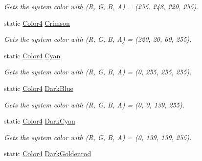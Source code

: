 \begin{DoxyCompactItemize}
\begin{DoxyCompactList}\small\item\em Gets the system color with (R, G, B, A) = (255, 248, 220, 255). \end{DoxyCompactList}\item 
static \hyperlink{struct_open_t_k_1_1_graphics_1_1_color4}{Color4} \hyperlink{struct_open_t_k_1_1_graphics_1_1_color4_acd4f65cfa6603eebfebf2cf170766608}{Crimson}
\begin{DoxyCompactList}\small\item\em Gets the system color with (R, G, B, A) = (220, 20, 60, 255). \end{DoxyCompactList}\item 
static \hyperlink{struct_open_t_k_1_1_graphics_1_1_color4}{Color4} \hyperlink{struct_open_t_k_1_1_graphics_1_1_color4_a003302558baa2446439a9379d58d44ad}{Cyan}
\begin{DoxyCompactList}\small\item\em Gets the system color with (R, G, B, A) = (0, 255, 255, 255). \end{DoxyCompactList}\item 
static \hyperlink{struct_open_t_k_1_1_graphics_1_1_color4}{Color4} \hyperlink{struct_open_t_k_1_1_graphics_1_1_color4_a86f850249f7ef3df8168152f862bb461}{Dark\-Blue}
\begin{DoxyCompactList}\small\item\em Gets the system color with (R, G, B, A) = (0, 0, 139, 255). \end{DoxyCompactList}\item 
static \hyperlink{struct_open_t_k_1_1_graphics_1_1_color4}{Color4} \hyperlink{struct_open_t_k_1_1_graphics_1_1_color4_a1f5edb879622eb928c1fa715887e4498}{Dark\-Cyan}
\begin{DoxyCompactList}\small\item\em Gets the system color with (R, G, B, A) = (0, 139, 139, 255). \end{DoxyCompactList}\item 
static \hyperlink{struct_open_t_k_1_1_graphics_1_1_color4}{Color4} \hyperlink{struct_open_t_k_1_1_graphics_1_1_color4_aac47950953635b78230a46521766ce83}{Dark\-Goldenrod}

\end{DoxyCompactItemize}
